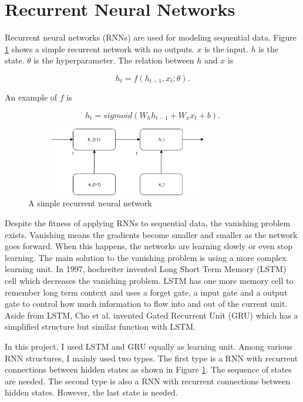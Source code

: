 \documentclass[modernstyle,12pt]{sjsuthesis}
\theoremstyle{definition}
\begin{document}
\section{Recurrent Neural Networks}\label{sect:rnn}

Recurrent neural networks (RNNs) \cite{rumelhart1986learning} are used for modeling sequential data. Figure \ref{f:rnnWithNoOutputs} shows a simple recurrent network with no outputs. $x$ is the input. $h$ is the state. $\theta$ is the hyperparameter. The relation between $h$ and $x$ is

$$h_t = f(h_{t-1}, x_t; \theta).$$

An example of $f$ is

$$h_t = sigmoid(W_h h_{t-1} + W_x x_t + b).$$

\begin{figure}[htbp]\centering
  \includegraphics[width=9cm, height=3cm]{figures/rnnWithNoOutputs}
  \caption{A simple recurrent neural network}
  \label{f:rnnWithNoOutputs}
\end{figure}



Despite the fitness of applying RNNs to sequential data, the vanishing problem exists. Vanishing means the gradients become smaller and smaller as the network goes forward. When this happens, the networks are learning slowly or even stop learning. The main solution to the vanishing problem is using a more complex learning unit. In 1997, hochreiter invented Long Short Term Memory (LSTM) cell \cite{hochreiter1997long} which decreases the vanishing problem. LSTM has one more memory cell to remember long term context and uses a forget gate, a input gate and a output gate to control how much information to flow into and out of the current unit. Aside from LSTM, Cho et al. invented Gated Recurrent Unit (GRU)\cite{cho2014learning} which has a simplified structure but similar function with LSTM.


In this project, I used LSTM and GRU equally as learning unit. Among various RNN structures, I mainly used two types. The first type is a RNN with recurrent connections between hidden states as shown in Figure \ref{f:rnnWithNoOutputs}. The sequence of  states are needed. The second type is also a RNN with recurrent connections between hidden states. However, the last state is needed.
\end{document}
